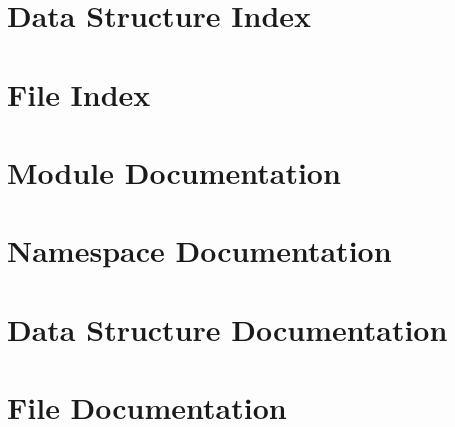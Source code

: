 \documentclass{book}
\begin{document}
\chapter{Data Structure Index}

\chapter{File Index}

\chapter{Module Documentation}


\chapter{Namespace Documentation}


\chapter{Data Structure Documentation}


\chapter{File Documentation}














\printindex
\end{document}
